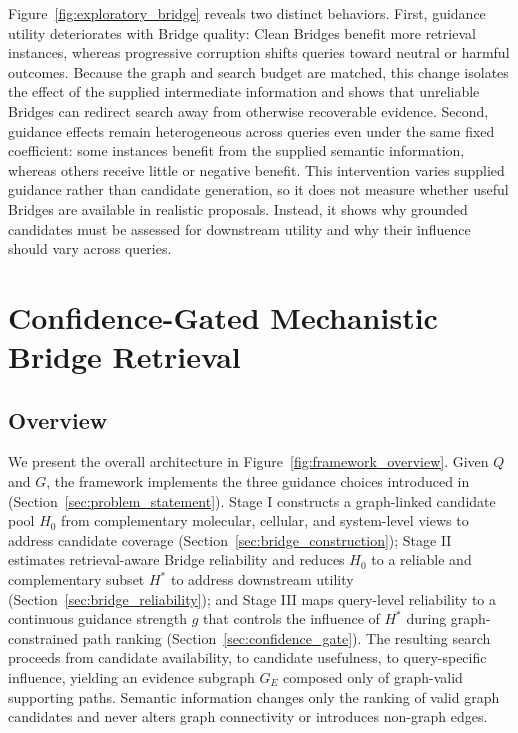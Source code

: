 \documentclass{article} %
\begin{document}
Figure~\ref{fig:exploratory_bridge} reveals two distinct behaviors. First,
guidance utility deteriorates with Bridge quality: Clean Bridges benefit more
retrieval instances, whereas progressive corruption shifts queries toward
neutral or harmful outcomes. Because the graph and search budget are matched,
this change isolates the effect of the supplied intermediate information and
shows that unreliable Bridges can redirect search away from otherwise
recoverable evidence. Second, guidance effects remain heterogeneous across
queries even under the same fixed coefficient: some instances benefit from the
supplied semantic information, whereas others receive little or negative
benefit. This intervention varies supplied guidance rather than candidate
generation, so it does not measure whether useful Bridges are available in
realistic proposals. Instead, it shows why grounded candidates must be assessed
for downstream utility and why their influence should vary across queries.

\section{Confidence-Gated Mechanistic Bridge Retrieval}
\label{sec:method}
\subsection{Overview}
\label{sec:method_overview}

We present the overall architecture in Figure~\ref{fig:framework_overview}. Given $Q$ and $G$, the framework implements the three guidance choices introduced in (Section~\ref{sec:problem_statement}). Stage I constructs a graph-linked candidate pool $H_0$ from complementary molecular, cellular, and system-level views to address candidate coverage (Section~\ref{sec:bridge_construction}); Stage II estimates retrieval-aware Bridge reliability and reduces $H_0$ to a reliable and complementary subset $H^*$ to address downstream utility (Section~\ref{sec:bridge_reliability}); and Stage III maps query-level reliability to a continuous guidance strength $g$ that controls the influence of $H^*$ during graph-constrained path ranking (Section~\ref{sec:confidence_gate}). The resulting search proceeds from candidate availability, to candidate usefulness, to query-specific influence, yielding an evidence subgraph $G_E$ composed only of graph-valid supporting paths. Semantic information changes only the ranking of valid graph candidates and never alters graph connectivity or introduces non-graph edges.
\end{document}
